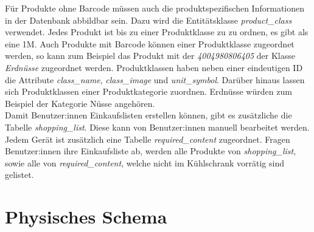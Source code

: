 Für Produkte ohne Barcode müssen auch die produktspezifischen Informationen in der Datenbank abbildbar sein. Dazu wird die Entitätsklasse \textit{product\_class} verwendet. Jedes Produkt ist bis zu einer Produktklasse zu zu ordnen, es gibt als eine \gls{1M}. Auch Produkte mit Barcode können einer Produktklasse zugeordnet werden, so kann zum Beispiel das Produkt mit der  \textit{4004980806405} der Klasse \textit{Erdnüsse} zugeordnet werden. Produktklassen haben neben einer eindeutigen ID die Attribute \textit{class\_name}, \textit{class\_image} und \textit{unit\_symbol}. Darüber hinaus lassen sich Produktklassen einer Produktkategorie zuordnen. Erdnüsse würden zum Beispiel der Kategorie Nüsse angehören.\\ Damit Benutzer:innen Einkaufslisten erstellen können, gibt es zusätzliche die Tabelle \textit{shopping\_list}. Diese kann von Benutzer:innen manuell bearbeitet werden. Jedem Gerät ist zusätzlich eine Tabelle \textit{required\_content} zugeordnet. Fragen Benutzer:innen ihre Einkaufsliste ab, werden alle Produkte von \textit{shopping\_list}, sowie alle von \textit{required\_content}, welche nicht im Kühlschrank vorrätig sind gelistet.

\section{Physisches Schema}\label{sec:Physisches Schema}

